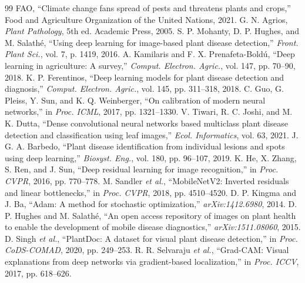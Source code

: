 \documentclass[11pt,a4paper]{article}
\begin{document}
\begin{thebibliography}{99}
 FAO, ``Climate change fans spread of pests and threatens plants and crops,'' Food and Agriculture Organization of the United Nations, 2021.
 G. N. Agrios, \emph{Plant Pathology}, 5th ed. Academic Press, 2005.
 S. P. Mohanty, D. P. Hughes, and M. Salath\'e, ``Using deep learning for image-based plant disease detection,'' \emph{Front. Plant Sci.}, vol. 7, p. 1419, 2016.
 A. Kamilaris and F. X. Prenafeta-Bold\'u, ``Deep learning in agriculture: A survey,'' \emph{Comput. Electron. Agric.}, vol. 147, pp. 70--90, 2018.
 K. P. Ferentinos, ``Deep learning models for plant disease detection and diagnosis,'' \emph{Comput. Electron. Agric.}, vol. 145, pp. 311--318, 2018.
 C. Guo, G. Pleiss, Y. Sun, and K. Q. Weinberger, ``On calibration of modern neural networks,'' in \emph{Proc. ICML}, 2017, pp. 1321--1330.
 V. Tiwari, R. C. Joshi, and M. K. Dutta, ``Dense convolutional neural networks based multiclass plant disease detection and classification using leaf images,'' \emph{Ecol. Informatics}, vol. 63, 2021.
 J. G. A. Barbedo, ``Plant disease identification from individual lesions and spots using deep learning,'' \emph{Biosyst. Eng.}, vol. 180, pp. 96--107, 2019.
 K. He, X. Zhang, S. Ren, and J. Sun, ``Deep residual learning for image recognition,'' in \emph{Proc. CVPR}, 2016, pp. 770--778.
 M. Sandler \emph{et al.}, ``MobileNetV2: Inverted residuals and linear bottlenecks,'' in \emph{Proc. CVPR}, 2018, pp. 4510--4520.
 D. P. Kingma and J. Ba, ``Adam: A method for stochastic optimization,'' \emph{arXiv:1412.6980}, 2014.
 D. P. Hughes and M. Salath\'e, ``An open access repository of images on plant health to enable the development of mobile disease diagnostics,'' \emph{arXiv:1511.08060}, 2015.
 D. Singh \emph{et al.}, ``PlantDoc: A dataset for visual plant disease detection,'' in \emph{Proc. CoDS-COMAD}, 2020, pp. 249--253.
 R. R. Selvaraju \emph{et al.}, ``Grad-CAM: Visual explanations from deep networks via gradient-based localization,'' in \emph{Proc. ICCV}, 2017, pp. 618--626.
\end{thebibliography}
\end{document}
